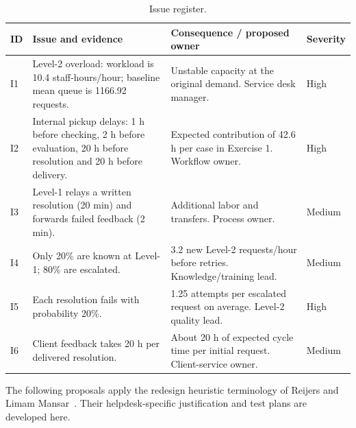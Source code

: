\documentclass[10pt,a4paper]{article}
\begin{document}
\begin{table}[htbp]
\centering\small
\caption{Issue register.}
\label{tab:issues}
\begin{tabularx}{\linewidth}{@{}p{7mm}Y Y p{17mm}@{}}
\toprule
ID & Issue and evidence & Consequence / proposed owner & Severity\\
\midrule
I1 & Level-2 overload: workload is 10.4 staff-hours/hour; baseline mean queue is
1166.92 requests. & Unstable capacity at the original demand. Service desk manager. & High\\
I2 & Internal pickup delays: 1 h before checking, 2 h before evaluation, 20 h before
resolution and 20 h before delivery. & Expected contribution of 42.6 h per case in
Exercise 1. Workflow owner. & High\\
I3 & Level-1 relays a written resolution (20 min) and forwards failed feedback
(2 min). & Additional labor and transfers. Process owner. & Medium\\
I4 & Only 20\% are known at Level-1; 80\% are escalated. & 3.2 new Level-2
requests/hour before retries. Knowledge/training lead. & Medium\\
I5 & Each resolution fails with probability 20\%. & 1.25 attempts per escalated
request on average. Level-2 quality lead. & High\\
I6 & Client feedback takes 20 h per delivered resolution. & About 20 h of expected
cycle time per initial request. Client-service owner. & Medium\\
\bottomrule
\end{tabularx}
\end{table}

The following proposals apply the redesign heuristic terminology of Reijers and
Limam Mansar~\cite{reijers2005}. Their helpdesk-specific justification and test
plans are developed here.
\end{document}
